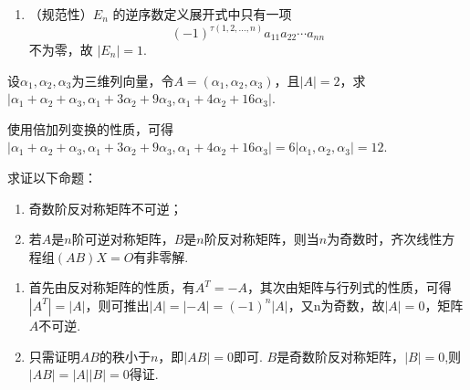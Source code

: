 \begin{exercise}
\begin{exgroup}
\begin{answer}
\begin{enumerate}
\begin{enumerate}
                        \item （规范性）$E_n$ 的逆序数定义展开式中只有一项
                            \[
                                (-1)^{\tau(1, 2, \ldots, n)} a_{11} a_{22} \cdots a_{nn}
                            \]
                            不为零，故 $|E_n| = 1$.
                    \end{enumerate}
            \end{enumerate}
        \end{answer}

        \item 设$\alpha_1,\alpha_2,\alpha_3$为三维列向量，令$A=(\alpha_1,\alpha_2,\alpha_3)$，且$|A|=2$，求$|\alpha_1+\alpha_2+\alpha_3,\alpha_1+3\alpha_2+9\alpha_3,\alpha_1+4\alpha_2+16\alpha_3|$.
        \begin{answer}
            使用倍加列变换的性质，可得$|\alpha_1+\alpha_2+\alpha_3,\alpha_1+3\alpha_2+9\alpha_3,\alpha_1+4\alpha_2+16\alpha_3|=6|\alpha_1,\alpha_2,\alpha_3|=12$.
        \end{answer}

        \item 求证以下命题：
        \begin{enumerate}
            \item 奇数阶反对称矩阵不可逆；

            \item 若$A$是$n$阶可逆对称矩阵，$B$是$n$阶反对称矩阵，则当$n$为奇数时，齐次线性方程组$(AB)X=O$有非零解.
        \end{enumerate}
        \begin{answer}
            \begin{enumerate}
                \item 首先由反对称矩阵的性质，有$A^T=-A$，其次由矩阵与行列式的性质，可得$|A^T|=|A|$，则可推出$|A|=|-A|=(-1)^n|A|$，又n为奇数，故$|A|=0$，矩阵$A$不可逆.

                \item 只需证明$AB$的秩小于$n$，即$|AB|=0$即可. $B$是奇数阶反对称矩阵，$|B|=0$,则$|AB|=|A||B|=0$得证.
            \end{enumerate}
        \end{answer}


\end{exgroup}
\end{exercise}
